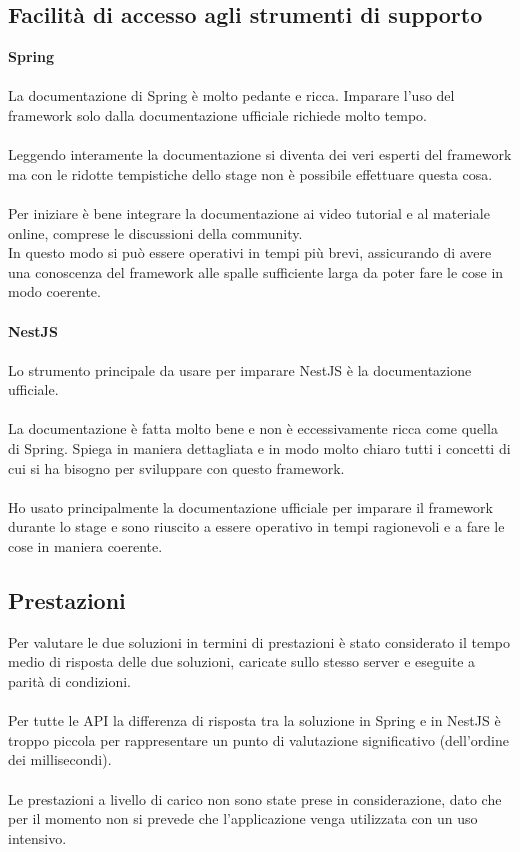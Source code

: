 \subsection{Facilità di accesso agli strumenti di supporto}
\textbf{Spring}
\\\\
La documentazione di Spring è molto pedante e ricca. Imparare l'uso del framework solo dalla documentazione 
ufficiale richiede molto tempo. 
\\\\
Leggendo interamente la documentazione si diventa dei veri esperti del framework ma con le ridotte tempistiche
dello stage non è possibile effettuare questa cosa.
\\\\
Per iniziare è bene integrare la documentazione ai video tutorial e al materiale online, comprese le discussioni 
della community. 
\\
In questo modo si può essere operativi in tempi più brevi, assicurando di avere una conoscenza
del framework alle spalle sufficiente larga da poter fare le cose in modo coerente.
\\\\
\textbf{NestJS}
\\\\
Lo strumento principale da usare per imparare NestJS è la documentazione ufficiale.
\\\\
La documentazione è fatta molto bene e non è eccessivamente ricca come quella di Spring. Spiega in maniera dettagliata
e in modo molto chiaro tutti i concetti di cui si ha bisogno per sviluppare con questo framework.
\\\\
Ho usato principalmente la documentazione ufficiale per imparare il framework durante lo stage e sono riuscito a essere
operativo in tempi ragionevoli e a fare le cose in maniera coerente.

\subsection{Prestazioni}
Per valutare le due soluzioni in termini di prestazioni è stato considerato il tempo medio di risposta delle due soluzioni, caricate sullo stesso 
server e eseguite a parità di condizioni.
\\\\
Per tutte le API la differenza di risposta tra la soluzione in Spring e in NestJS è troppo piccola per rappresentare un punto
di valutazione significativo (dell'ordine dei millisecondi).
\\\\
Le prestazioni a livello di carico non sono state prese in considerazione, dato che per il momento non si prevede che l'applicazione 
venga utilizzata con un uso intensivo.

